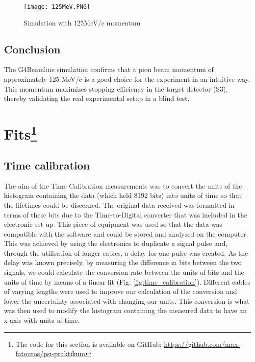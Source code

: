 \documentclass[11pt,a4paper]{article}
\begin{document}
\begin{figure}[h]
\centering
\texttt{[image: 125MeV.PNG]}
\caption{Simulation with 125MeV/c momentum}
\label{fig:125mev}
\end{figure}

\subsection{Conclusion}
The G4Beamline simulation confirms that a pion beam momentum of approximately 125 MeV/c is a good choice for the experiment in an intuitive way. This momentum maximizes stopping efficiency in the target detector (S3), thereby validating the real experimental setup in a blind test. 



\section{Fits\protect\footnote{The code for this section is available on GitHub: \url{https://github.com/max-fatouros/psi-praktikum}}}
\subsection{Time calibration}
The aim of the Time Calibration measurements was to convert the units of the histogram containing the data (which held 8192 bits) into units of time so that the lifetimes could be discerned. The original data received was formatted in terms of these bits due to the Time-to-Digital converter that was included in the electronic set up. This piece of equipment was used so that the data was compatible with the software and could be stored and analysed on the computer. This was achieved by using the electronics to duplicate a signal pulse and, through the utilisation of longer cables, a delay for one pulse was created. As the delay was known precisely, by measuring the difference in bits between the two signals, we could calculate the conversion rate between the units of bits and the units of time by means of a linear fit (Fig. \ref{fig:time_calibration}). Different cables of varying lengths were used to improve our calculation of the conversion and lower the uncertainty associated with changing our units. This conversion is what was then used to modify the histogram containing the measured data to have an x-axis with units of time.
\end{document}
